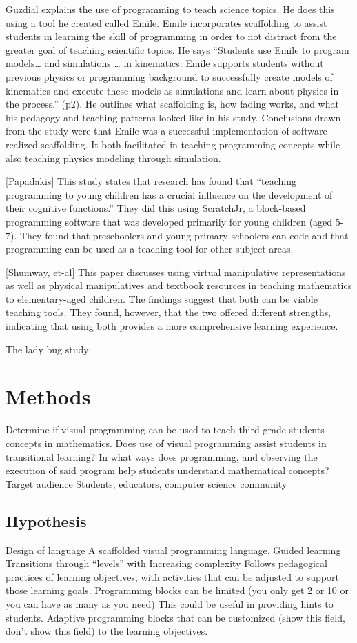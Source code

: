 \documentclass[12pt]{extarticle}
\begin{document}
Guzdial explains the use of programming to teach science topics. He does this using a tool he created called Emile. Emile incorporates scaffolding to assist students in learning the skill of programming in order to not distract from the greater goal of teaching scientific topics. He says “Students use Emile to program models… and simulations … in kinematics. Emile supports students without previous physics or programming background to successfully create models of kinematics and execute these models as simulations and learn about physics in the process.” (p2). He outlines what scaffolding is, how fading works, and what his pedagogy and teaching patterns looked like in his study. Conclusions drawn from the study were that Emile was a successful implementation of software realized scaffolding. It both facilitated in teaching programming concepts while also teaching physics modeling through simulation.

[Papadakis] This study states that research has found that “teaching programming to young children has a crucial influence on the development of their cognitive functions.” They did this using ScratchJr, a block-based programming software that was developed primarily for young children (aged 5-7). They found that preschoolers and young primary schoolers can code and that programming can be used as a teaching tool for other subject areas.

[Shumway, et-al] This paper discusses using virtual manipulative representations as well as physical manipulatives and textbook resources in teaching mathematics to elementary-aged children. The findings suggest that both can be viable teaching tools. They found, however, that the two offered different strengths, indicating that using both provides a more comprehensive learning experience.

The lady bug study

\section*{Methods}
Determine if visual programming can be used to teach third grade students concepts in mathematics.
Does use of visual programming assist students in transitional learning?
In what ways does programming, and observing the execution of said program help students understand mathematical concepts?
Target audience
Students, educators, computer science community
\subsection*{Hypothesis}
Design of language
A scaffolded visual programming language. 
Guided learning
Transitions through “levels” with Increasing complexity
Follows pedagogical practices of learning objectives,  with activities that can be adjusted to support those learning goals. 
Programming blocks can be limited (you only get 2 or 10 or you can have as many as you need) This could be useful in providing hints to students. 
Adaptive programming blocks that can be customized (show this field, don’t show this field) to the learning objectives.
\end{document}
